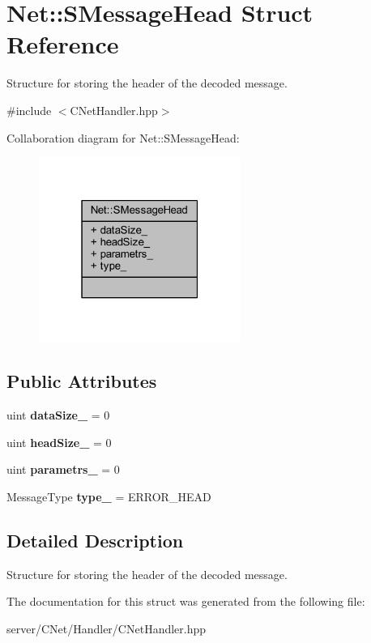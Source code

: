 \hypertarget{struct_net_1_1_s_message_head}{}\section{Net\+:\+:S\+Message\+Head Struct Reference}
\label{struct_net_1_1_s_message_head}


Structure for storing the header of the decoded message.  




{\ttfamily \#include $<$C\+Net\+Handler.\+hpp$>$}



Collaboration diagram for Net\+:\+:S\+Message\+Head\+:
\nopagebreak
\begin{figure}[H]
\begin{center}
\leavevmode
\includegraphics[width=187pt]{struct_net_1_1_s_message_head__coll__graph}
\end{center}
\end{figure}
\subsection*{Public Attributes}
\begin{DoxyCompactItemize}
\item 
\mbox{\label{struct_net_1_1_s_message_head_a2e01a7a3434acdfc8e7342267fe26935}} 
uint {\bfseries data\+Size\+\_\+} = 0
\item 
\mbox{\label{struct_net_1_1_s_message_head_a93f8e120b7c67e935a42f5a130119983}} 
uint {\bfseries head\+Size\+\_\+} = 0
\item 
\mbox{\label{struct_net_1_1_s_message_head_a97d84a5454b38da45791c9fe4bcd2d6a}} 
uint {\bfseries parametrs\+\_\+} = 0
\item 
\mbox{\label{struct_net_1_1_s_message_head_a67e646e8fe21f7e21f91a3bf1010f248}} 
Message\+Type {\bfseries type\+\_\+} = E\+R\+R\+O\+R\+\_\+\+H\+E\+AD
\end{DoxyCompactItemize}


\subsection{Detailed Description}
Structure for storing the header of the decoded message. 

The documentation for this struct was generated from the following file\+:\begin{DoxyCompactItemize}
\item 
server/\+C\+Net/\+Handler/C\+Net\+Handler.\+hpp\end{DoxyCompactItemize}
